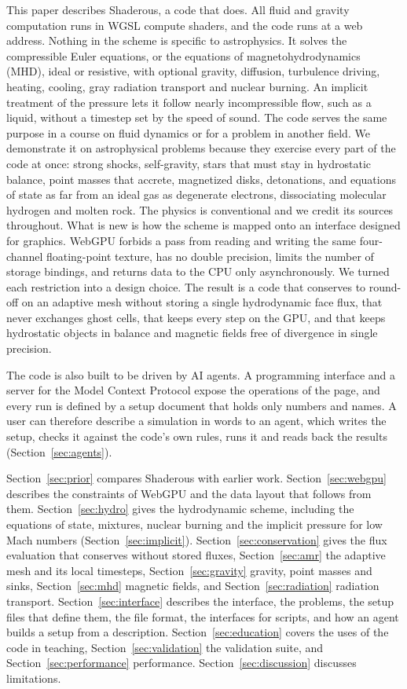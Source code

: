 \documentclass[twocolumn]{aastex701}
\begin{document}
This paper describes Shaderous, a code that does. All fluid and gravity computation runs in WGSL compute shaders, and the code runs at a web address. Nothing in the scheme is specific to astrophysics. It solves the compressible Euler equations, or the equations of magnetohydrodynamics (MHD), ideal or resistive, with optional gravity, diffusion, turbulence driving, heating, cooling, gray radiation transport and nuclear burning. An implicit treatment of the pressure lets it follow nearly incompressible flow, such as a liquid, without a timestep set by the speed of sound. The code serves the same purpose in a course on fluid dynamics or for a problem in another field. We demonstrate it on astrophysical problems because they exercise every part of the code at once: strong shocks, self-gravity, stars that must stay in hydrostatic balance, point masses that accrete, magnetized disks, detonations, and equations of state as far from an ideal gas as degenerate electrons, dissociating molecular hydrogen and molten rock. The physics is conventional and we credit its sources throughout. What is new is how the scheme is mapped onto an interface designed for graphics. WebGPU forbids a pass from reading and writing the same four-channel floating-point texture, has no double precision, limits the number of storage bindings, and returns data to the CPU only asynchronously. We turned each restriction into a design choice. The result is a code that conserves to round-off on an adaptive mesh without storing a single hydrodynamic face flux, that never exchanges ghost cells, that keeps every step on the GPU, and that keeps hydrostatic objects in balance and magnetic fields free of divergence in single precision.

The code is also built to be driven by AI agents. A programming interface and a server for the Model Context Protocol expose the operations of the page, and every run is defined by a setup document that holds only numbers and names. A user can therefore describe a simulation in words to an agent, which writes the setup, checks it against the code's own rules, runs it and reads back the results (Section~\ref{sec:agents}).

Section~\ref{sec:prior} compares Shaderous with earlier work. Section~\ref{sec:webgpu} describes the constraints of WebGPU and the data layout that follows from them. Section~\ref{sec:hydro} gives the hydrodynamic scheme, including the equations of state, mixtures, nuclear burning and the implicit pressure for low Mach numbers (Section~\ref{sec:implicit}). Section~\ref{sec:conservation} gives the flux evaluation that conserves without stored fluxes, Section~\ref{sec:amr} the adaptive mesh and its local timesteps, Section~\ref{sec:gravity} gravity, point masses and sinks, Section~\ref{sec:mhd} magnetic fields, and Section~\ref{sec:radiation} radiation transport. Section~\ref{sec:interface} describes the interface, the problems, the setup files that define them, the file format, the interfaces for scripts, and how an agent builds a setup from a description. Section~\ref{sec:education} covers the uses of the code in teaching, Section~\ref{sec:validation} the validation suite, and Section~\ref{sec:performance} performance. Section~\ref{sec:discussion} discusses limitations.
\end{document}
